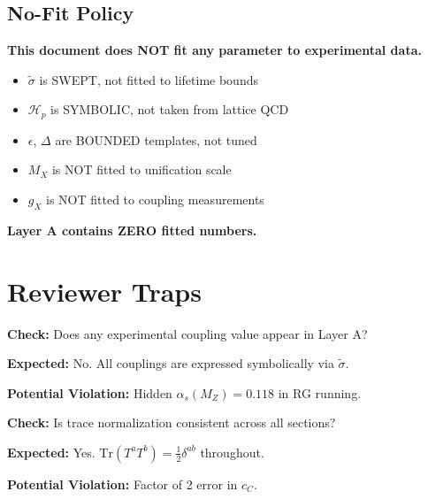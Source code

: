 \documentclass[11pt,a4paper]{article}
\theoremstyle{definition}
\begin{document}
\subsection{No-Fit Policy}
\label{subsec:no-fit-policy}

\begin{nofitbox}
\textbf{This document does NOT fit any parameter to experimental data.}

\begin{itemize}
  \item $\tilde{\sigma}$ is SWEPT, not fitted to lifetime bounds
  \item $\mathcal{H}_p$ is SYMBOLIC, not taken from lattice QCD
  \item $\epsilon$, $\Delta$ are BOUNDED templates, not tuned
  \item $M_X$ is NOT fitted to unification scale
  \item $g_X$ is NOT fitted to coupling measurements
\end{itemize}

\textbf{Layer A contains ZERO fitted numbers.}
\end{nofitbox}

\section{Reviewer Traps}
\label{sec:reviewer-traps}

\begin{trapbox}
\textbf{Check:} Does any experimental coupling value appear in Layer A?

\textbf{Expected:} No. All couplings are expressed symbolically via $\tilde{\sigma}$.

\textbf{Potential Violation:} Hidden $\alpha_s(M_Z) = 0.118$ in RG running.
\end{trapbox}

\begin{trapbox}
\textbf{Check:} Is trace normalization consistent across all sections?

\textbf{Expected:} Yes. $\text{Tr}(T^a T^b) = \frac{1}{2}\delta^{ab}$ throughout.

\textbf{Potential Violation:} Factor of 2 error in $c_C$.
\end{trapbox}
\end{document}
